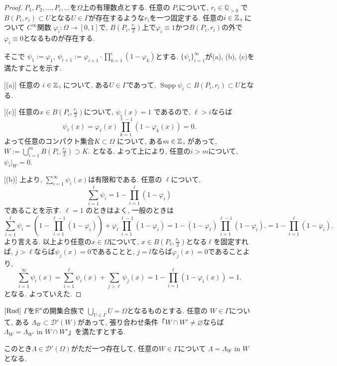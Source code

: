 \begin{proof}
\(P_1, P_2, \dots, P_i, \dots\)を\(\Omega\)上の有理数点とする. 
任意の \(P_i\)について,  \(r_i \in \mathbb{Q}_{>0}\) で\(B(P_i, r_i) \subset U\)となる$U \in \Gamma$が存在するような$r_i$を一つ固定する. 
任意の\(i \in \mathbb{Z}_+\)について
\(C^\infty\)関数 \(\varphi_i: \Omega \to [0,1]\)で, 
$B(P_i, \tfrac{r_i}{2})$上で\(\varphi_i \equiv 1\)かつ\(B(P_i, r_i)\)の外で\(\varphi_i \equiv 0\)となるものが存在する.

そこで \(\psi_1 := \varphi_1\), \(\psi_{i+1} := \varphi_{i+1} \cdot \prod_{k=1}^i (1-\varphi_k)\)とする.
 \(\{\psi_i\}_{i=1}^\infty\)が(a), (b), (c)を満たすことを示す.

[(a)]
任意の \(i \in \mathbb{Z}_+\)について, ある$U \in \Gamma$であって, 
 \(\operatorname{Supp}\psi_i \subset B(P_i, r_i) \subset U\)となる.
 
 [(c)]
任意の\(x \in B(P_i, \tfrac{r_i}{2})\)について, $\psi_i (x)=1$
であるので, $\ell>i$ならば 
\[
\psi_\ell(x) = \varphi_\ell(x) \prod_{k=1}^{\ell -1} (1-\varphi_k(x)) = 0.
\]
よって任意のコンパクト集合\( K \subset \Omega\) について, ある\( m \in \mathbb{Z}_+\)があって,   
\(W := \bigcup_{i=1}^m B(P_i, \tfrac{r_i}{2}) \supset K\). 
となる. よって上により,  任意の$ i > m$について, \(\psi_i|_W = 0\). 

[(b)]
上より, \(\sum_{i=1}^\infty \psi_i(x)\)は有限和である.
任意の \(\ell\)について,  \[\sum_{i=1}^\ell \psi_i = 1 - \prod_{i=1}^\ell (1-\varphi_i)\]であることを示す.
\(\ell=1\) のときはよく, 
一般のときは
\[
\sum_{i=1}^\ell \psi_i = (1-\prod_{i=1}^{\ell-1}(1-\varphi_i)) + \varphi_\ell \prod_{i=1}^{\ell-1}(1-\varphi_i)
= 1 - (1 - \varphi_{\ell})\prod_{i=1}^{\ell-1} (1-\varphi_i).
= 1 - \prod_{i=1}^\ell (1-\varphi_i).
\]
より言える. 
以上より任意の\(x \in \Omega\)について, \(x \in B(P_\ell, \tfrac{r_\ell}{2})\)となる\(\ell\)を固定すれば, 
$j > \ell$ならば$\psi_{j}(x)=0$であることと, $j=l$ならば$\varphi_j(x)=0$であることより, 
\[
\sum_{i=1}^\infty \psi_i(x) 
= \sum_{i=1}^\ell \psi_i(x) + \sum_{j>\ell} \psi_j(x)
= 1 - \prod_{i=1}^\ell (1-\varphi_i(x)) = 1.
\]
となる. よっていえた.
\end{proof}

\begin{tcolorbox}[mybox]
\begin{thm}{$\cite[Thm 6.21]{Rud}$}
\label{thm-H-21}
\(\Gamma\)を\(\mathbb{R}^n\)の開集合族で
\(\bigcup_{U \in \Gamma} U = \Omega\)となるものとする. 
任意の \(W \in \Gamma\)について, ある \(\Lambda_W \subset \mathcal{D}'(W)\)があって, 
張り合わせ条件「\(W \cap W' \neq \varnothing\)ならば \(\Lambda_W = \Lambda_{W'} \text{ in } W \cap W'\)」を満たすとする.

このとき\(\Lambda \in \mathcal{D}'(\Omega)\)がただ一つ存在して, 任意の$W \in \Gamma$について
 \(\Lambda = \Lambda_W \text{ in } W \)となる. 
\end{thm}
\end{tcolorbox}

